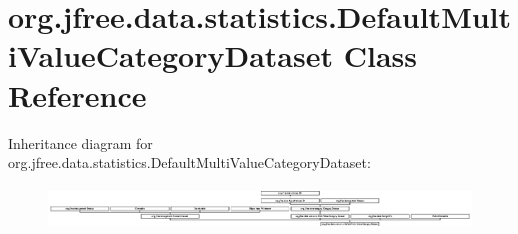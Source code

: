 \hypertarget{classorg_1_1jfree_1_1data_1_1statistics_1_1_default_multi_value_category_dataset}{}\section{org.\+jfree.\+data.\+statistics.\+Default\+Multi\+Value\+Category\+Dataset Class Reference}
\label{classorg_1_1jfree_1_1data_1_1statistics_1_1_default_multi_value_category_dataset}
Inheritance diagram for org.\+jfree.\+data.\+statistics.\+Default\+Multi\+Value\+Category\+Dataset\+:\begin{figure}[H]
\begin{center}
\leavevmode
\includegraphics[height=1.156069cm]{classorg_1_1jfree_1_1data_1_1statistics_1_1_default_multi_value_category_dataset}
\end{center}
\end{figure}
